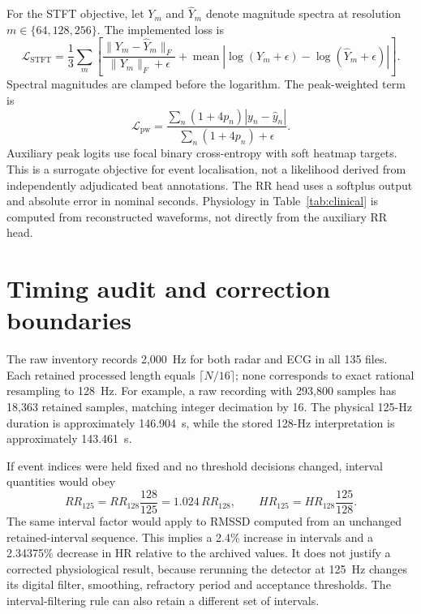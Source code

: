 \documentclass[11pt,a4paper]{article}
\begin{document}
For the STFT objective, let $Y_m$ and $\widehat Y_m$ denote magnitude spectra at resolution
$m\in\{64,128,256\}$. The implemented loss is
\begin{equation}
\mathcal L_{\mathrm{STFT}}=\frac13\sum_m\left[
\frac{\|Y_m-\widehat Y_m\|_F}{\|Y_m\|_F+\epsilon}
+\operatorname{mean}\left|\log(Y_m+\epsilon)-\log(\widehat Y_m+\epsilon)\right|
\right].
\end{equation}
Spectral magnitudes are clamped before the logarithm. The peak-weighted term is
\begin{equation}
\mathcal L_{\mathrm{pw}}=
\frac{\sum_n(1+4p_n)|y_n-\hat y_n|}{\sum_n(1+4p_n)+\epsilon}.
\end{equation}
Auxiliary peak logits use focal binary cross-entropy with soft heatmap targets. This is
a surrogate objective for event localisation, not a likelihood derived from independently
adjudicated beat annotations. The RR head uses a softplus output and absolute error in
nominal seconds. Physiology in Table~\ref{tab:clinical} is computed from reconstructed
waveforms, not directly from the auxiliary RR head.

\section{Timing audit and correction boundaries}
\label{app:timing}

The raw inventory records 2,000~Hz for both radar and ECG in all 135 files. Each retained
processed length equals $\lceil N/16\rceil$; none corresponds to exact rational resampling
to 128~Hz. For example, a raw recording with 293,800 samples has 18,363 retained samples,
matching integer decimation by 16. The physical 125-Hz duration is approximately 146.904~s,
while the stored 128-Hz interpretation is approximately 143.461~s.

If event indices were held fixed and no threshold decisions changed, interval quantities
would obey
\begin{equation}
RR_{125}=RR_{128}\frac{128}{125}=1.024\,RR_{128},
\qquad HR_{125}=HR_{128}\frac{125}{128}.
\end{equation}
The same interval factor would apply to RMSSD computed from an unchanged retained-interval
sequence. This implies a 2.4\% increase in intervals and a 2.34375\% decrease in HR relative
to the archived values. It does not justify a corrected physiological result, because
rerunning the detector at 125~Hz changes its digital filter, smoothing, refractory period
and acceptance thresholds. The interval-filtering rule can also retain a different set
of intervals.
\end{document}
